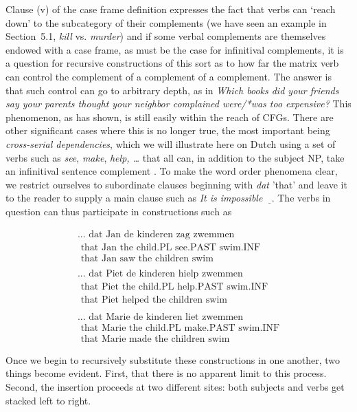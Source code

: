 Clause (v) of the case frame definition expresses the fact that verbs can
`reach down' to the subcategory of their complements (we have seen an example
in Section~5.1, {\it kill} vs. {\it murder}) and if some verbal complements
are themselves endowed with a case frame, as must be the case for infinitival
complements, it is a question for recursive constructions of this sort as to
how far the matrix verb can control the complement of a complement of a
complement.  The answer is that such control can go to arbitrary depth, as in
{\it Which books did your friends say your parents thought your neighbor
  complained were/*was too expensive?} This phenomenon, as
 has shown, is still easily within the reach of
CFGs. There are other significant cases where this is no longer true, the most
important being {\it cross-serial dependencies}, which we will illustrate here
on Dutch using a set of verbs such as {\it see}, {\it make}, {\it help,
  \ldots} that all can, in addition to the subject NP, take an infinitival
sentence complement \cite{Huybregts:1976}.  To make the word order phenomena
clear, we restrict ourselves to subordinate clauses beginning with {\it dat}
'that' and leave it to the reader to supply a main clause such as {\it It is
  impossible~$\underline{\ \ }$}.  The verbs in question can thus participate
in constructions such as 

\begin{eqnarray}
\mbox{... dat Jan de kinderen zag zwemmen}\\
\mbox{ that Jan the child.PL see.PAST swim.INF}\nonumber \\
\mbox{ that Jan saw the children swim}\nonumber\\
\mbox{ }\nonumber\\
\mbox{... dat Piet de kinderen hielp zwemmen}\nonumber \\
\mbox{ that Piet the child.PL help.PAST swim.INF}\nonumber \\
\mbox{ that Piet helped the children swim}\nonumber\\
\mbox{ }\nonumber\\
\mbox{... dat Marie de kinderen liet zwemmen}\nonumber \\
\mbox{ that Marie the child.PL make.PAST swim.INF}\nonumber \\
\mbox{ that Marie made the children swim}\nonumber
\end{eqnarray}

\noindent
Once we begin to recursively substitute these constructions in one another,
two things become evident. First, that there is no apparent limit to this
process. Second, the insertion proceeds at two different sites: both
subjects and verbs get stacked left to right. 

